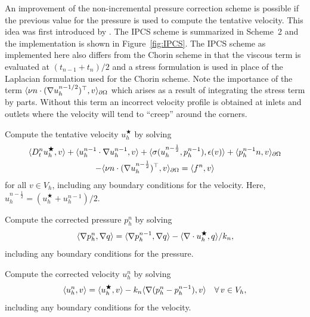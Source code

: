 An improvement of the non-incremental pressure correction scheme is
possible if the previous value for the pressure is used to compute the
tentative velocity. This idea was first introduced by
\citet{Goda1979}. The IPCS scheme is summarized in Scheme~2 and the
implementation is shown in Figure~\ref{fig:IPCS}. The IPCS scheme as
implemented here also differs from the Chorin scheme in that the
viscous term is evaluated at $(t_{n-1} + t_n)/2$ and a stress
formulation is used in place of the Laplacian formulation used for the
Chorin scheme. Note the importance of the term $\renni{v}{\nu n \cdot (\nabla
  u_h^{n-1/2})^{\top}}_{\partial\Omega}$ which arises as a result of
integrating the stress term by parts. Without this term an incorrect
velocity profile is obtained at inlets and outlets where the velocity
will tend to ``creep'' around the corners.

{
\item
  Compute the tentative velocity $u_h^\bigstar$ by solving
  \begin{multline}\label{eq:ipcs,1}
      \renni{v}{D_t^n u_h^{\bigstar}}
      + \renni{v}{u_h^{n-1} \cdot \nabla u_h^{n-1}}
      + \renni{\epsilon(v)}{\sigma(u_h^{n-\frac{1}{2}}, p^{n-1}_h)}
      + \renni{v}{p^{n-1}_h n}_{\partial\Omega}
      \\
      - \renni{v}{\nu n \cdot (\nabla u_h^{n-\frac{1}{2}})^{\top}}_{\partial\Omega}
      = \renni{v}{f^n}
  \end{multline}
  for all $v \in V_h$, including any boundary conditions for the
  velocity. Here, $u_h^{n-\frac{1}{2}} = (u_h^{\bigstar} + u_h^{n-1}) / 2$.

\item
  Compute the corrected pressure $p_h^n$ by solving
  \begin{equation}\label{eq:ipcs,2}
    \renni{\nabla q}{\nabla p^n_h}
    = \renni{\nabla q}{\nabla p^{n-1}_h} - \renni{q}{\nabla \cdot u_h^{\bigstar}} / k_n,
  \end{equation}
  including any boundary conditions for the pressure.

\item
  Compute the corrected velocity $u_h^n$ by solving
  \begin{equation}\label{eq:ipcs,3}
    \renni{v}{u_h^n} = \renni{v}{u_h^{\bigstar}} - k_n\renni{v}{\nabla(p_h^n-p_h^{n-1})}
    \quad \foralls v \in V_h,
  \end{equation}
  including any boundary conditions for the
  velocity.
  \label{ipcs_listing}
}

